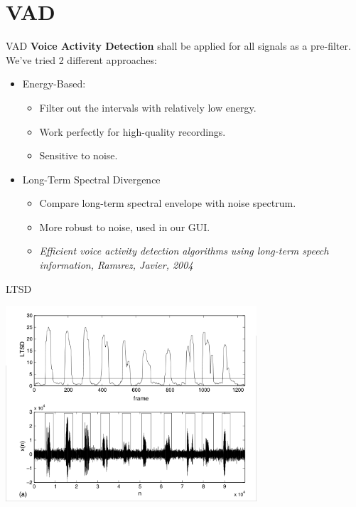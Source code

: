 
\section{VAD}
\begin{frame}{VAD}
  \textbf{Voice Activity Detection} shall be applied for all signals as a pre-filter.
  We've tried 2 different approaches:
  \pause
  \begin{itemize}
    \item Energy-Based:
      \begin{itemize}
        \item Filter out the intervals with relatively low energy.
        \item Work perfectly for high-quality recordings.
        \item Sensitive to noise.
      \end{itemize}
      \pause

    \item Long-Term Spectral Divergence
      \begin{itemize}
        \item Compare long-term spectral envelope with noise spectrum.
        \item More robust to noise, used in our GUI.
        \item
            \footnotesize\it\color{red!50!black}
            Efficient voice activity detection algorithms using long-term speech information,
            Ramırez, Javier, 2004
      \end{itemize}
  \end{itemize}
\end{frame}

\begin{frame}{LTSD}
  \begin{center}
    \includegraphics[width=0.7\textwidth]{res/ltsd.png}
  \end{center}
\end{frame}
